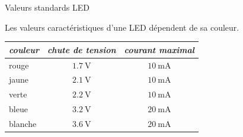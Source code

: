 \documentclass[aspectratio=169,utf8,french]{beamer}
\begin{document}
\begin{frame}{Valeurs standards LED}
  \begin{center}
    Les valeurs caractéristiques d'une LED dépendent de sa couleur.
    \vspace{1em} \\
    \begin{tabular}{|l|c|c|}
      \hline 
      \emph{couleur} & \emph{chute de tension} & \emph{courant maximal} \\ 
      \hline 
      rouge & $\SI{1.7}{\volt}$ & $\SI{10}{\milli\ampere}$ \\ 
      jaune & $\SI{2.1}{\volt}$ & $\SI{10}{\milli\ampere}$ \\ 
      verte & $\SI{2.2}{\volt}$ & $\SI{10}{\milli\ampere}$ \\ 
      bleue & $\SI{3.2}{\volt}$ & $\SI{20}{\milli\ampere}$ \\ 
      blanche & $\SI{3.6}{\volt}$ & $\SI{20}{\milli\ampere}$ \\ 
      \hline 
    \end{tabular}
  \end{center}
\end{frame}

\end{document}
